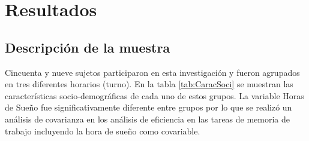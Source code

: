 \documentclass[12pt,letterpaper,final]{article}
\begin{document}
\section{Resultados}
\subsection{Descripción de la muestra}
Cincuenta y nueve sujetos participaron en esta investigación y fueron  agrupados en tres diferentes horarios (turno). En la tabla \ref{tab:CaracSoci} se muestran las características socio-demográficas de cada uno de estos grupos. La variable Horas de Sueño fue significativamente diferente entre grupos por lo que se realizó un análisis de covarianza en los análisis de eficiencia en las tareas de memoria de trabajo incluyendo la hora de sueño como covariable. 
\end{document}
